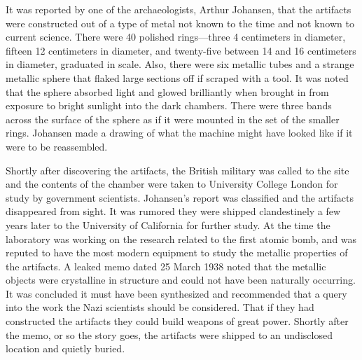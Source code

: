 It was reported by one of the archaeologists, Arthur Johansen, that the
artifacts were constructed out of a type of metal not known to the time
and not known to current science. There were 40 polished rings---three 4
centimeters in diameter, fifteen 12 centimeters in diameter, and
twenty-five between 14 and 16 centimeters in diameter, graduated in
scale. Also, there were six metallic tubes and a strange metallic sphere
that flaked large sections off if scraped with a tool. It was noted that
the sphere absorbed light and glowed brilliantly when brought in from
exposure to bright sunlight into the dark chambers. There were three
bands across the surface of the sphere as if it were mounted in the set
of the smaller rings. Johansen made a drawing of what the machine might
have looked like if it were to be reassembled.

Shortly after discovering the artifacts, the British military was called
to the site and the contents of the chamber were taken to University
College London for study by government scientists. Johansen's report was
classified and the artifacts disappeared from sight. It was rumored they
were shipped clandestinely a few years later to the University of
California for further study. At the time the laboratory was working on
the research related to the first atomic bomb, and was reputed to have
the most modern equipment to study the metallic properties of the
artifacts. A leaked memo dated 25 March 1938 noted that the metallic
objects were crystalline in structure and could not have been naturally
occurring. It was concluded it must have been synthesized and
recommended that a query into the work the Nazi scientists should be
considered. That if they had constructed the artifacts they could build
weapons of great power. Shortly after the memo, or so the story goes,
the artifacts were shipped to an undisclosed location and quietly
buried.

